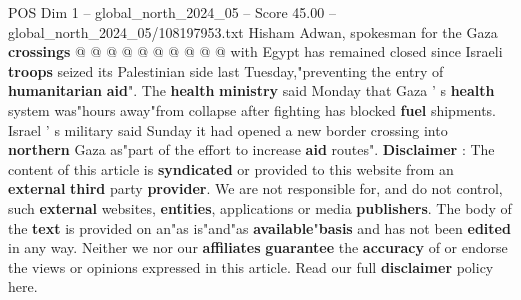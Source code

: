 \begin{textsample}{POS Dim 1 – global\_north\_2024\_05 – Score 45.00 – global\_north\_2024\_05/108197953.txt}
Hisham Adwan, spokesman for the Gaza \textbf{crossings} @ @ @ @ @ @ @ @ @ @ with Egypt has remained closed since Israeli \textbf{troops} seized its Palestinian side last Tuesday,"preventing the entry of \textbf{humanitarian} \textbf{aid}".
The \textbf{health} \textbf{ministry} said Monday that Gaza ' s \textbf{health} system was"hours away"from collapse after fighting has blocked \textbf{fuel} shipments.
Israel ' s military said Sunday it had opened a new border crossing into \textbf{northern} Gaza as"part of the effort to increase \textbf{aid} routes". \textbf{Disclaimer} : The content of this article is \textbf{syndicated} or provided to this website from an \textbf{external} \textbf{third} party \textbf{provider}.
We are not responsible for, and do not control, such \textbf{external} websites, \textbf{entities}, applications or media \textbf{publishers}.
The body of the \textbf{text} is provided on an"as is"and"as \textbf{available}"\textbf{basis} and has not been \textbf{edited} in any way.
Neither we nor our \textbf{affiliates} \textbf{guarantee} the \textbf{accuracy} of or endorse the views or opinions expressed in this article.
Read our full \textbf{disclaimer} policy here.

\end{textsample}
